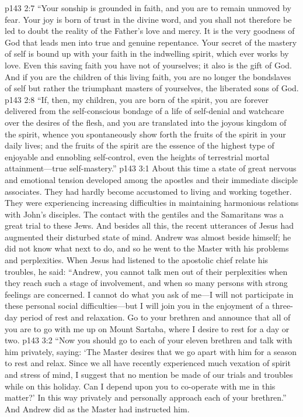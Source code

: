 \vs p143 2:7 \textcolor{ubdarkred}{“Your sonship is grounded in faith, and you are to remain unmoved by fear. Your joy is born of trust in the divine word, and you shall not therefore be led to doubt the reality of the Father’s love and mercy. It is the very goodness of God that leads men into true and genuine repentance. Your secret of the mastery of self is bound up with your faith in the indwelling spirit, which ever works by love. Even this saving faith you have not of yourselves; it also is the gift of God. And if you are the children of this living faith, you are no longer the bondslaves of self but rather the triumphant masters of yourselves, the liberated sons of God.}
\vs p143 2:8 \textcolor{ubdarkred}{“If, then, my children, you are born of the spirit, you are forever delivered from the self\hyp{}conscious bondage of a life of self\hyp{}denial and watchcare over the desires of the flesh, and you are translated into the joyous kingdom of the spirit, whence you spontaneously show forth the fruits of the spirit in your daily lives; and the fruits of the spirit are the essence of the highest type of enjoyable and ennobling self\hyp{}control, even the heights of terrestrial mortal attainment---true self\hyp{}mastery.”}
\vs p143 3:1 About this time a state of great nervous and emotional tension developed among the apostles and their immediate disciple associates. They had hardly become accustomed to living and working together. They were experiencing increasing difficulties in maintaining harmonious relations with John’s disciples. The contact with the gentiles and the Samaritans was a great trial to these Jews. And besides all this, the recent utterances of Jesus had augmented their disturbed state of mind. Andrew was almost beside himself; he did not know what next to do, and so he went to the Master with his problems and perplexities. When Jesus had listened to the apostolic chief relate his troubles, he said: \textcolor{ubdarkred}{“Andrew, you cannot talk men out of their perplexities when they reach such a stage of involvement, and when so many persons with strong feelings are concerned. I cannot do what you ask of me---I will not participate in these personal social difficulties---but I will join you in the enjoyment of a three\hyp{}day period of rest and relaxation. Go to your brethren and announce that all of you are to go with me up on Mount Sartaba, where I desire to rest for a day or two.}
\vs p143 3:2 \textcolor{ubdarkred}{“Now you should go to each of your eleven brethren and talk with him privately, saying: ‘The Master desires that we go apart with him for a season to rest and relax. Since we all have recently experienced much vexation of spirit and stress of mind, I suggest that no mention be made of our trials and troubles while on this holiday. Can I depend upon you to co\hyp{}operate with me in this matter?’ In this way privately and personally approach each of your brethren.”} And Andrew did as the Master had instructed him.
